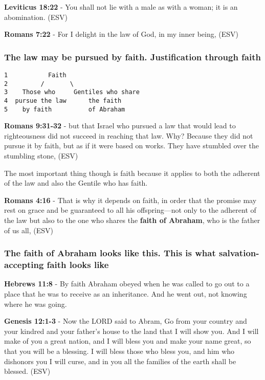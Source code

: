 \documentclass[11pt]{article}
\begin{document}
\textbf{Leviticus 18:22} - You shall not lie with a male as with a woman; it is an abomination. (ESV)

\textbf{Romans 7:22} - For I delight in the law of God, in my inner being, (ESV)

\subsubsection{The law may be pursued by faith. Justification through faith}
\label{sec:org8edaf65}

\begin{verbatim}
1           Faith
2         /       \
3    Those who     Gentiles who share
4  pursue the law      the faith
5    by faith          of Abraham
\end{verbatim}

\textbf{Romans 9:31-32} - but that Israel who pursued a law that would lead to righteousness did not succeed in reaching that law. Why? Because they did not pursue it by faith, but as if it were based on works. They have stumbled over the stumbling stone, (ESV)

The most important thing though is faith because it applies to both the adherent of the law and also the Gentile who has faith.

\textbf{Romans 4:16} - That is why it depends on faith, in order that the promise may rest on grace and be guaranteed to all his offspring—not only to the adherent of the law but also to the one who shares the \textbf{faith of Abraham}, who is the father of us all, (ESV)

\subsubsection{The faith of Abraham looks like this. This is what salvation-accepting faith looks like}
\label{sec:orga54a6c8}

\textbf{Hebrews 11:8} - By faith Abraham obeyed when he was called to go out to a place that he was to receive as an inheritance. And he went out, not knowing where he was going.

\textbf{Genesis 12:1-3} - Now the LORD said to Abram, Go from your country and your kindred and your father's house to the land that I will show you. And I will make of you a great nation, and I will bless you and make your name great, so that you will be a blessing. I will bless those who bless you, and him who dishonors you I will curse, and in you all the families of the earth shall be blessed. (ESV)
\end{document}
